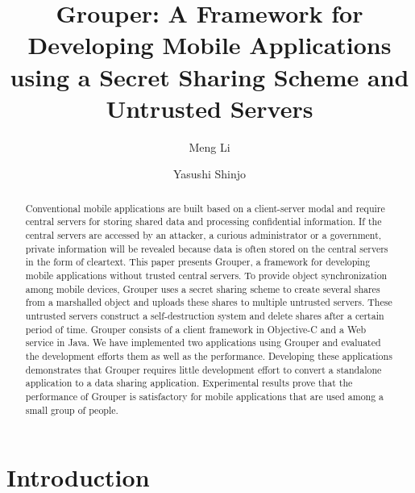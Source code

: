 \documentclass[sigconf]{acmart}
\begin{document}
\title{Grouper: A Framework for Developing Mobile Applications using a Secret Sharing Scheme and Untrusted Servers}

\author{Meng Li}

\author{Yasushi Shinjo}

\renewcommand{\shortauthors}{Li et al.}

\begin{abstract}
	
Conventional mobile applications are built based on a client-server modal and require central servers for storing shared data and processing confidential information.
If the central servers are accessed by an attacker, a curious administrator or a government, private information will be revealed because data is often stored on the central servers in the form of cleartext.
This paper presents Grouper, a framework for developing mobile applications without trusted central servers.
To provide object synchronization among mobile devices, Grouper uses a secret sharing scheme to create several shares from a marshalled object and uploads these shares to multiple untrusted servers. 
These untrusted servers construct a self-destruction system and delete shares after a certain period of time.
Grouper consists of a client framework in Objective-C and a Web service in Java.
We have implemented two applications using Grouper and evaluated the development efforts them as well as the performance. 
Developing these applications demonstrates that Grouper requires little development effort to convert a standalone application to a data sharing application.
Experimental results prove that the performance of Grouper is satisfactory for mobile applications that are used among a small group of people.

\end{abstract}


\maketitle

\section{Introduction}
\end{document}
